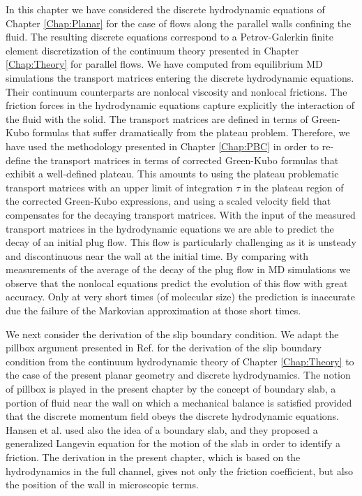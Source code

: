 \documentclass[b5paper,openright,10pt]{book}
\begin{document}
In this chapter  we have  considered the  discrete hydrodynamic
equations of  Chapter \ref{Chap:Planar} for  the case of  flows along the  parallel walls
confining the fluid. The resulting  discrete equations correspond to a
Petrov-Galerkin finite element discretization  of the continuum theory
presented in Chapter \ref{Chap:Theory} for  parallel flows.  We have computed
from equilibrium  MD simulations  the transport matrices  entering the
discrete  hydrodynamic equations.   Their  continuum counterparts  are
nonlocal viscosity  and nonlocal frictions.  The  friction forces in
the hydrodynamic  equations capture explicitly the  interaction of the
fluid with the solid.  The transport  matrices are defined in terms of
Green-Kubo formulas that suffer dramatically from the plateau problem.
Therefore, we have used the methodology presented in Chapter \ref{Chap:PBC} in
order  to  re-define the  transport  matrices  in terms  of  corrected
Green-Kubo  formulas  that  exhibit   a  well-defined  plateau.   This
amounts to using  the plateau problematic transport  matrices with an
upper  limit  of integration  $\tau$  in  the  plateau region  of  the
corrected Green-Kubo  expressions, and  using a scaled  velocity field
that compensates for the decaying  transport matrices.  With the input
of the  measured transport matrices  in the hydrodynamic  equations we
are able to predict  the decay of an initial plug  flow.  This flow is
particularly challenging as  it is unsteady and discontinuous near the  wall at the
initial time.   By comparing with  measurements of the average  of the
decay of the plug flow in MD simulations we observe that the nonlocal
equations predict the evolution of this flow with great accuracy. Only
at very short  times (of molecular size) the  prediction is inaccurate
due the failure of the Markovian approximation at those short times.

We next  consider the  derivation of the  slip boundary  condition. We
adapt  the  pillbox  argument  presented in  Ref.   \cite{CamargoBC2018}  for  the
derivation  of   the  slip  boundary  condition   from  the  continuum
hydrodynamic theory of Chapter \ref{Chap:Theory} to the case  of the present
planar geometry and  discrete hydrodynamics. The notion  of pillbox is
played in the present chapter by  the concept of boundary slab, a portion
of fluid  near the  wall on  which a  mechanical balance  is satisfied
provided  that   the  discrete  momentum  field   obeys  the  discrete
hydrodynamic equations. Hansen et  al. \cite{Hansen2011} used also the
idea  of a  boundary slab,  and they  proposed a  generalized Langevin
equation  for  the  motion  of  the   slab  in  order  to  identify  a
friction. The derivation  in the present chapter, which is  based on the
hydrodynamics  in  the  full  channel, gives  not  only  the  friction
coefficient, but also the position of the wall in microscopic terms.
\end{document}
